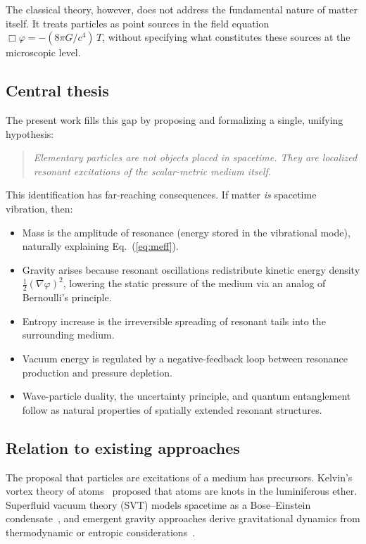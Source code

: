 \documentclass[aps,prd,onecolumn,superscriptaddress,nofootinbib,showpacs,12pt,notitlepage]{revtex4-2}
\begin{document}
The classical theory, however, does not address the fundamental
nature of matter itself.  It treats particles as point sources in the
field equation $\Box\varphi = -(8\pi G/c^4)\,T$, without specifying
what constitutes these sources at the microscopic level.

\subsection{Central thesis}

The present work fills this gap by proposing and formalizing a single,
unifying hypothesis:

\begin{quote}
\textit{Elementary particles are not objects placed in spacetime.
They are localized resonant excitations of the scalar-metric
medium itself.}
\end{quote}

This identification has far-reaching consequences.  If matter
\emph{is} spacetime vibration, then:
\begin{itemize}
  \item Mass is the amplitude of resonance (energy stored in the
    vibrational mode), naturally explaining
    Eq.~(\ref{eq:meff}).
  \item Gravity arises because resonant oscillations redistribute
    kinetic energy density $\frac{1}{2}(\nabla\varphi)^2$,
    lowering the static pressure of the medium via an analog of
    Bernoulli's principle.
  \item Entropy increase is the irreversible spreading of resonant
    tails into the surrounding medium.
  \item Vacuum energy is regulated by a negative-feedback loop
    between resonance production and pressure depletion.
  \item Wave-particle duality, the uncertainty principle, and
    quantum entanglement follow as natural properties of
    spatially extended resonant structures.
\end{itemize}

\subsection{Relation to existing approaches}

The proposal that particles are excitations of a medium has
precursors.  Kelvin's vortex theory of atoms~\cite{Thomson1867}
proposed that atoms are knots in the luminiferous ether.
Superfluid vacuum theory (SVT) models spacetime as a
Bose--Einstein condensate~\cite{Volovik2003,Zloshchastiev2011},
and emergent gravity approaches
derive gravitational dynamics from
thermodynamic or entropic
considerations~\cite{Verlinde2011,Jacobson1995}.
\end{document}
